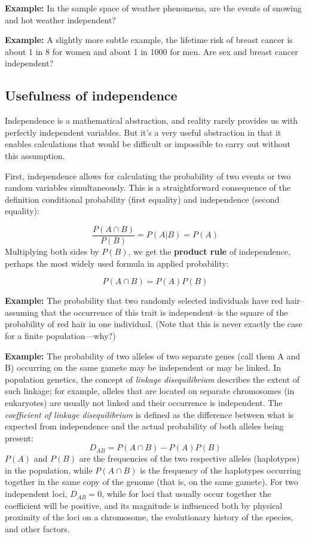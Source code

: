 \documentclass[
  letterpaper,
  DIV=11,
  numbers=noendperiod]{scrreprt}
\begin{document}
\textbf{Example:} In the sample space of weather phenomena, are the
events of snowing and hot weather independent?

\textbf{Example:} A slightly more subtle example, the lifetime risk of
breast cancer is about 1 in 8 for women and about 1 in 1000 for men. Are
sex and breast cancer independent?

\hypertarget{usefulness-of-independence}{%
\subsection{Usefulness of
independence}\label{usefulness-of-independence}}

Independence is a mathematical abstraction, and reality rarely provides
us with perfectly independent variables. But it's a very useful
abstraction in that it enables calculations that would be difficult or
impossible to carry out without this assumption.

First, independence allows for calculating the probability of two events
or two random variables simultaneously. This is a straightforward
consequence of the definition conditional probability (first equality)
and independence (second equality):

\[\frac{P(A \cap B)}{P(B)}= P(A\vert B) = P(A)\] Multiplying both sides
by \(P(B)\), we get the \textbf{product rule} of independence, perhaps
the most widely used formula in applied probability:

\[P(A \cap B) = P(A)P(B)\]

\textbf{Example:} The probability that two randomly selected individuals
have red hair--assuming that the occurrence of this trait is
independent--is the square of the probability of red hair in one
individual. (Note that this is never exactly the case for a finite
population---why?)

\textbf{Example:} The probability of two alleles of two separate genes
(call them A and B) occurring on the same gamete may be independent or
may be linked. In population genetics, the concept of \emph{linkage
disequilibrium} describes the extent of such linkage; for example,
alleles that are located on separate chromosomes (in eukaryotes) are
usually not linked and their occurrence is independent. The
\emph{coefficient of linkage disequilibrium} is defined as the
difference between what is expected from independence and the actual
probability of both alleles being present:
\[D_{AB} = P(A \cap B) - P(A)P(B) \] \(P(A)\) and \(P(B)\) are the
frequencies of the two respective alleles (haplotypes) in the
population, while \(P(A \cap B)\) is the frequency of the haplotypes
occurring together in the same copy of the genome (that is, on the same
gamete). For two independent loci, \(D_{AB} = 0\), while for loci that
usually occur together the coefficient will be positive, and its
magnitude is influenced both by physical proximity of the loci on a
chromosome, the evolutionary history of the species, and other factors.
\end{document}
